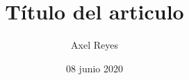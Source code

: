 \documentclass[letterpaper]{article} %
\title{Título del articulo} %
\author{Axel Reyes} %
\date{08 junio 2020} %
\begin{document}
    \maketitle %
    \renewcommand{\tablename}{Tabla} %


\end{document}
